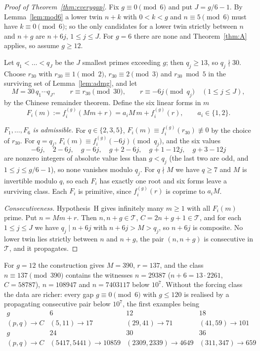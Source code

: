 \documentclass[11pt,a4paper]{article}
\theoremstyle{definition}
\theoremstyle{remark}
\newcommand{\T}{\mathcal{T}}
\begin{document}
\begin{proof}[Proof of Theorem~\ref{thm:everygap}]
Fix $g\equiv 0\pmod 6$ and put $J = g/6 - 1$.
By Lemma~\ref{lem:mod6} a lower twin $n+k$ with $0<k<g$ and $n\equiv 5\pmod 6$ must have $k\equiv 0\pmod 6$; so the only candidates for a lower twin strictly between $n$ and $n+g$ are $n+6j$, $1\le j\le J$.
For $g=6$ there are none and Theorem~\ref{thm:A} applies, so assume $g\ge 12$.

Let $q_1<\dots<q_J$ be the $J$ smallest primes exceeding $g$; then $q_j\ge 13$, so $q_j\nmid 30$.
Choose $r_{30}$ with $r_{30}\equiv 1\pmod 2$, $r_{30}\equiv 2\pmod 3$ and $r_{30}\bmod 5$ in the surviving set of Lemma~\ref{lem:admg}, and let
\[
M = 30\, q_1\cdots q_J,\qquad r\equiv r_{30}\pmod{30},\qquad r\equiv -6j\pmod{q_j}\quad(1\le j\le J),
\]
by the Chinese remainder theorem. Define the six linear forms in $m$
\[
F_i(m) := f^{(g)}_i(Mm+r) = a_iM\,m + f^{(g)}_i(r),\qquad a_i\in\{1,2\}.
\]

\emph{$F_1,\dots,F_6$ is admissible.}
For $q\in\{2,3,5\}$, $F_i(m)\equiv f^{(g)}_i(r_{30})\not\equiv 0$ by the choice of $r_{30}$.
For $q = q_j$, $F_i(m)\equiv f^{(g)}_i(-6j)\pmod{q_j}$, and the six values
\[
-6j,\quad 2-6j,\quad g-6j,\quad g+2-6j,\quad g+1-12j,\quad g+3-12j
\]
are nonzero integers of absolute value less than $g<q_j$ (the last two are odd, and $1\le j\le g/6-1$), so none vanishes modulo $q_j$.
For $q\nmid M$ we have $q\ge 7$ and $M$ is invertible modulo $q$, so each $F_i$ has exactly one root and six forms leave a surviving class.
Each $F_i$ is primitive, since $f^{(g)}_i(r)$ is coprime to $a_iM$.

\emph{Consecutiveness.} Hypothesis~H gives infinitely many $m\ge 1$ with all $F_i(m)$ prime. Put $n = Mm+r$. Then $n, n+g\in\T$, $C = 2n+g+1\in\T$, and for each $1\le j\le J$ we have $q_j\mid n+6j$ with $n+6j > M > q_j$, so $n+6j$ is composite.
No lower twin lies strictly between $n$ and $n+g$, the pair $(n,n+g)$ is consecutive in $\T$, and it propagates.
\end{proof}

For $g = 12$ the construction gives $M = 390$, $r = 137$, and the class $n\equiv 137\pmod{390}$ contains the witnesses $n = 29387$ ($n+6 = 13\cdot 2261$, $C = 58787$), $n = 108947$ and $n = 7403117$ below $10^7$.
Without the forcing class the data are richer: every gap $g\equiv 0\pmod 6$ with $g\le 120$ is realised by a propagating consecutive pair below $10^7$, the first examples being
\[
\begin{array}{c|ccc}
g & 6 & 12 & 18\\ \hline
(p,q)\to C & (5,11)\to 17 & (29,41)\to 71 & (41,59)\to 101\\[4pt]
g & 24 & 30 & 36\\ \hline
(p,q)\to C & (5417,5441)\to 10859 & (2309,2339)\to 4649 & (311,347)\to 659
\end{array}
\]
\end{document}
